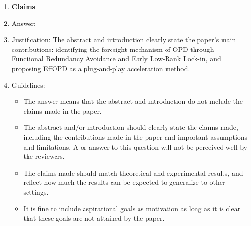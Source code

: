 \documentclass{article}
\begin{document}
\begin{enumerate}
\item {\bf Claims}
    \item[] Answer: \answerYes{}
    \item[] Justification: The abstract and introduction clearly state the paper's main contributions: identifying the foresight mechanism of OPD through Functional Redundancy Avoidance and Early Low-Rank Lock-in, and proposing EffOPD as a plug-and-play acceleration method.
    \item[] Guidelines:
    \begin{itemize}
        \item The answer \answerNA{} means that the abstract and introduction do not include the claims made in the paper.
        \item The abstract and/or introduction should clearly state the claims made, including the contributions made in the paper and important assumptions and limitations. A \answerNo{} or \answerNA{} answer to this question will not be perceived well by the reviewers. 
        \item The claims made should match theoretical and experimental results, and reflect how much the results can be expected to generalize to other settings. 
        \item It is fine to include aspirational goals as motivation as long as it is clear that these goals are not attained by the paper. 
    \end{itemize}


\end{enumerate}
\end{document}
